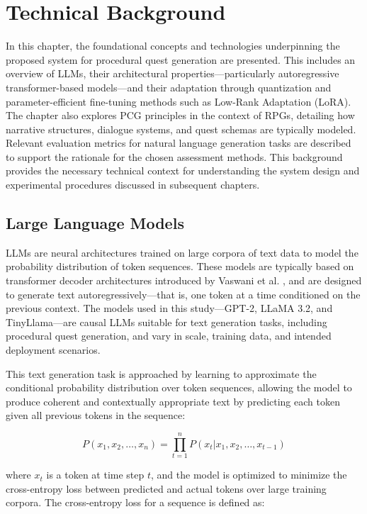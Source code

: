 \clearpage

\chapter{Technical Background}

In this chapter, the foundational concepts and technologies underpinning the proposed system for procedural
quest generation are presented. This includes an overview of
LLMs, their architectural properties—particularly autoregressive transformer-based models—and
their adaptation through quantization and parameter-efficient fine-tuning methods
such as Low-Rank Adaptation (LoRA). The chapter also explores PCG principles
in the context of RPGs, detailing how narrative structures, dialogue systems, and quest
schemas are typically modeled. Relevant evaluation metrics for natural language generation
tasks are described to support the rationale for the chosen assessment methods. This
background provides the necessary technical context for understanding the system design
and experimental procedures discussed in subsequent chapters.

\section{Large Language Models}

LLMs are neural architectures trained on large corpora of text data to model the probability
distribution of token sequences. These models are typically based on transformer
decoder architectures introduced by Vaswani et al. \cite{vaswani2017attention}, and are designed to generate text
autoregressively—that is, one token at a time conditioned on the previous context. The
models used in this study—GPT-2, LLaMA 3.2, and TinyLlama—are causal LLMs suitable
for text generation tasks, including procedural quest generation, and vary in scale,
training data, and intended deployment scenarios.

This text generation task is approached by learning to approximate the conditional
probability distribution over token sequences, allowing the model to produce coherent and
contextually appropriate text by predicting each token given all previous tokens in the
sequence:

\begin{equation}
  P(x_1, x_2, \dots, x_n) = \prod_{t=1}^n P(x_t | x_1, x_2, \dots, x_{t-1})
  \label{tokengen}
\end{equation}

where $x_t$ is a token at time step $t$, and the model is optimized to minimize the cross-entropy
loss between predicted and actual tokens over large training corpora. The cross-entropy
loss for a sequence is defined as:

